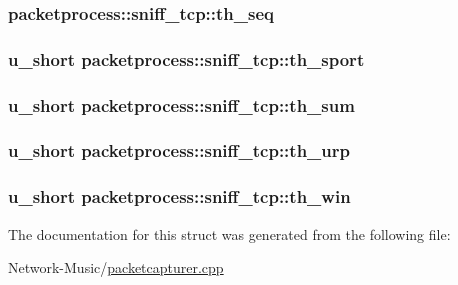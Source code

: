 \hypertarget{structpacketprocess_1_1sniff__tcp_aa01277954ec955054dd5d1c3b03f2839}{
\subsubsection[{th\-\_\-seq}]{ packetprocess\-::sniff\-\_\-tcp\-::th\-\_\-seq}}\label{structpacketprocess_1_1sniff__tcp_aa01277954ec955054dd5d1c3b03f2839}
\hypertarget{structpacketprocess_1_1sniff__tcp_ab814641263dc3626b73e8e7c57b49a00}{
\subsubsection[{th\-\_\-sport}]{\setlength{\rightskip}{0pt plus 5cm}u\-\_\-short packetprocess\-::sniff\-\_\-tcp\-::th\-\_\-sport}}\label{structpacketprocess_1_1sniff__tcp_ab814641263dc3626b73e8e7c57b49a00}
\hypertarget{structpacketprocess_1_1sniff__tcp_a8cf363fe4f55a8327ae61ed1eec128f6}{
\subsubsection[{th\-\_\-sum}]{\setlength{\rightskip}{0pt plus 5cm}u\-\_\-short packetprocess\-::sniff\-\_\-tcp\-::th\-\_\-sum}}\label{structpacketprocess_1_1sniff__tcp_a8cf363fe4f55a8327ae61ed1eec128f6}
\hypertarget{structpacketprocess_1_1sniff__tcp_ae7950e9fd8826097186f481337406cf8}{
\subsubsection[{th\-\_\-urp}]{\setlength{\rightskip}{0pt plus 5cm}u\-\_\-short packetprocess\-::sniff\-\_\-tcp\-::th\-\_\-urp}}\label{structpacketprocess_1_1sniff__tcp_ae7950e9fd8826097186f481337406cf8}
\hypertarget{structpacketprocess_1_1sniff__tcp_ab968a17a027d8c57b3c9235cd820adc5}{
\subsubsection[{th\-\_\-win}]{\setlength{\rightskip}{0pt plus 5cm}u\-\_\-short packetprocess\-::sniff\-\_\-tcp\-::th\-\_\-win}}\label{structpacketprocess_1_1sniff__tcp_ab968a17a027d8c57b3c9235cd820adc5}


The documentation for this struct was generated from the following file\-:\begin{DoxyCompactItemize}
\item 
Network-\/\-Music/\hyperlink{packetcapturer_8cpp}{packetcapturer.\-cpp}\end{DoxyCompactItemize}
